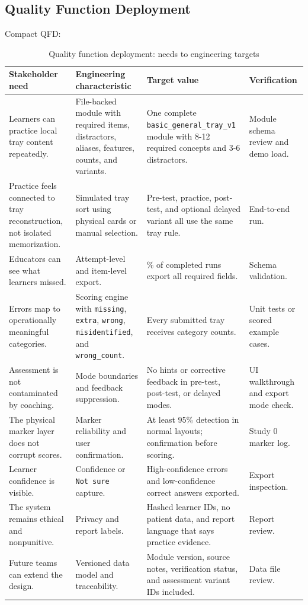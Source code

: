 \documentclass[10pt,a4paper]{article}
\begin{document}
\subsection{Quality Function Deployment}
\label{sec:quality-function-deployment}

Compact QFD:
\begin{table}[H]
\centering
\caption{Quality function deployment: needs to engineering targets}
\label{tab:quality-function-deployment-needs-to-engineering-targets}
\small\renewcommand{\arraystretch}{1.2}\setlength{\tabcolsep}{4pt}
\begin{tabularx}{\textwidth}{|>{\raggedright\arraybackslash}X|>{\raggedright\arraybackslash}X|>{\raggedright\arraybackslash}X|>{\raggedright\arraybackslash}X|}
\hline
Stakeholder need & Engineering characteristic & Target value & Verification \\
\hline
Learners can practice local tray content repeatedly. & File-backed module with required items, distractors, aliases, features, counts, and variants. & One complete \texttt{basic\_general\_tray\_v1} module with 8-12 required concepts and 3-6 distractors. & Module schema review and demo load. \\
\hline
Practice feels connected to tray reconstruction, not isolated memorization. & Simulated tray sort using physical cards or manual selection. & Pre-test, practice, post-test, and optional delayed variant all use the same tray rule. & End-to-end run. \\
\hline
Educators can see what learners missed. & Attempt-level and item-level export. & 100\% of completed runs export all required fields. & Schema validation. \\
\hline
Errors map to operationally meaningful categories. & Scoring engine with \texttt{missing}, \texttt{extra}, \texttt{wrong}, \texttt{misidentified}, and \texttt{wrong\_count}. & Every submitted tray receives category counts. & Unit tests or scored example cases. \\
\hline
Assessment is not contaminated by coaching. & Mode boundaries and feedback suppression. & No hints or corrective feedback in pre-test, post-test, or delayed modes. & UI walkthrough and export mode check. \\
\hline
The physical marker layer does not corrupt scores. & Marker reliability and user confirmation. & At least 95\% detection in normal layouts; confirmation before scoring. & Study 0 marker log. \\
\hline
Learner confidence is visible. & Confidence or \texttt{Not sure} capture. & High-confidence errors and low-confidence correct answers exported. & Export inspection. \\
\hline
The system remains ethical and nonpunitive. & Privacy and report labels. & Hashed learner IDs, no patient data, and report language that says practice evidence. & Report review. \\
\hline
Future teams can extend the design. & Versioned data model and traceability. & Module version, source notes, verification status, and assessment variant IDs included. & Data file review. \\
\hline
\end{tabularx}
\end{table}
\end{document}
